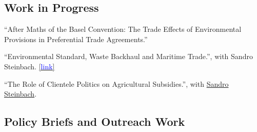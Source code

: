\documentclass[10.5 pt,letterpaper]{article}
\renewenvironment{itemize}{
	\begin{list}{}{
			\setlength{\leftmargin}{1.5em}
		}
	}{
	\end{list}
}
\begin{document}
 
 \subsection*{\textbf{ Work in Progress}}
 
 \begin{itemize}
 
 	
 	\item[-] ``After Maths of the Basel Convention: The Trade Effects of Environmental Provisions in Preferential Trade Agreements.''
 	 	
 	
 	\item[-] ``Environmental Standard, Waste Backhaul and Maritime Trade.'',
 	with Sandro Steinbach. 
 	\href{https://scholar.google.com/citations?view_op=view_citation&hl=en&user=gSddLM4AAAAJ&citation_for_view=gSddLM4AAAAJ:9yKSN-GCB0IC}{[{\underline{\textcolor{blue}{link}}}]}
 	
 
 	
 	\item[-] ``The Role of Clientele Politics on Agricultural Subsidies.'',
 	with
 	\href{https://are.uconn.edu/person/sandro-steinbach/}{Sandro Steinbach}.   
 	

 	
 	

 	
 \end{itemize}
 

\subsection*{\textbf{Policy Briefs and Outreach Work}}
\end{document}
